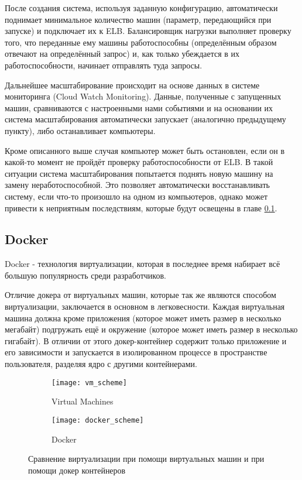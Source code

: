 	После создания система, используя заданную конфигурацию, автоматически поднимает минимальное количество машин (параметр, передающийся при запуске) и подключает их к ELB. Балансировщик нагрузки выполняет проверку того, что переданные ему машины работоспособны (определённым образом отвечают на определённый запрос) и, как только убеждается в их работоспособности, начинает отправлять туда запросы.
	
	Дальнейшее масштабирование происходит на основе данных в системе мониторинга (Cloud Watch Monitoring). Данные, полученные с запущенных машин, сравниваются с настроенными нами событиями и на основании их система масштабирования автоматически  запускает (аналогично предыдущему пункту), либо останавливает компьютеры.
	
	Кроме описанного выше случая компьютер может быть остановлен, если он в какой-то момент не пройдёт проверку работоспособности от ELB. В такой ситуации система масштабирования попытается поднять новую машину на замену неработоспособной. Это позволяет автоматически восстанавливать систему, если что-то произошло на одном из компьютеров, однако может привести к неприятным последствиям, которые будут освещены в главе \ref{}.

\subsection{Docker}

	Docker - технология виртуализации, которая в последнее время набирает всё большую популярность среди разработчиков. 
	
	Отличие докера от виртуальных машин, которые так же являются способом виртуализации, заключается в основном в легковесности. Каждая виртуальная машина должна кроме приложения (которое может иметь размер в несколько мегабайт) подгружать ещё и окружение (которое может иметь размер в несколько гигабайт). В отличии от этого докер-контейнер содержит только приложение и его зависимости и запускается в изолированном процессе в пространстве пользователя, разделяя ядро с другими контейнерами.
\begin{figure}[h]
	\centering
	\begin{subfigure}[b]{.5\textwidth}
  		\texttt{[image: vm\_scheme]}
  		\caption{Virtual Machines}
  		\label{fig:sub1}
	\end{subfigure}%
	\begin{subfigure}[b]{.5\textwidth}
  		\texttt{[image: docker\_scheme]}
  		\caption{Docker}
  		\label{fig:sub2}
	\end{subfigure}
	\caption{Сравнение виртуализации при помощи виртуальных машин и при помощи докер контейнеров}
	\label{fig:test}
\end{figure}

